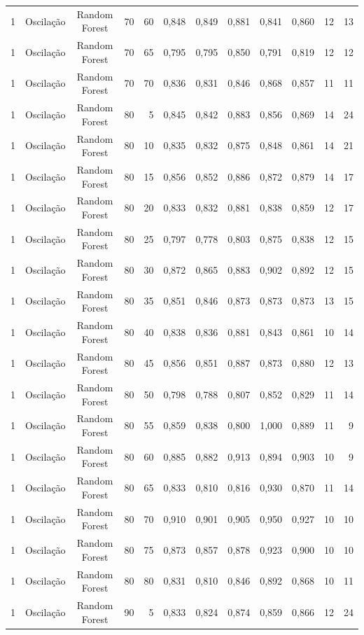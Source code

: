 \begin{longtable}{ccclrrrrrrrr}
1 & Oscilação & Random Forest & 70 & 60 & 0,848 & 0,849 & 0,881 & 0,841 & 0,860 & 12 & 13 \\
1 & Oscilação & Random Forest & 70 & 65 & 0,795 & 0,795 & 0,850 & 0,791 & 0,819 & 12 & 12 \\
1 & Oscilação & Random Forest & 70 & 70 & 0,836 & 0,831 & 0,846 & 0,868 & 0,857 & 11 & 11 \\
1 & Oscilação & Random Forest & 80 & 5 & 0,845 & 0,842 & 0,883 & 0,856 & 0,869 & 14 & 24 \\
1 & Oscilação & Random Forest & 80 & 10 & 0,835 & 0,832 & 0,875 & 0,848 & 0,861 & 14 & 21 \\
1 & Oscilação & Random Forest & 80 & 15 & 0,856 & 0,852 & 0,886 & 0,872 & 0,879 & 14 & 17 \\
1 & Oscilação & Random Forest & 80 & 20 & 0,833 & 0,832 & 0,881 & 0,838 & 0,859 & 12 & 17 \\
1 & Oscilação & Random Forest & 80 & 25 & 0,797 & 0,778 & 0,803 & 0,875 & 0,838 & 12 & 15 \\
1 & Oscilação & Random Forest & 80 & 30 & 0,872 & 0,865 & 0,883 & 0,902 & 0,892 & 12 & 15 \\
1 & Oscilação & Random Forest & 80 & 35 & 0,851 & 0,846 & 0,873 & 0,873 & 0,873 & 13 & 15 \\
1 & Oscilação & Random Forest & 80 & 40 & 0,838 & 0,836 & 0,881 & 0,843 & 0,861 & 10 & 14 \\
1 & Oscilação & Random Forest & 80 & 45 & 0,856 & 0,851 & 0,887 & 0,873 & 0,880 & 12 & 13 \\
1 & Oscilação & Random Forest & 80 & 50 & 0,798 & 0,788 & 0,807 & 0,852 & 0,829 & 11 & 14 \\
1 & Oscilação & Random Forest & 80 & 55 & 0,859 & 0,838 & 0,800 & 1,000 & 0,889 & 11 & 9 \\
1 & Oscilação & Random Forest & 80 & 60 & 0,885 & 0,882 & 0,913 & 0,894 & 0,903 & 10 & 9 \\
1 & Oscilação & Random Forest & 80 & 65 & 0,833 & 0,810 & 0,816 & 0,930 & 0,870 & 11 & 14 \\
1 & Oscilação & Random Forest & 80 & 70 & 0,910 & 0,901 & 0,905 & 0,950 & 0,927 & 10 & 10 \\
1 & Oscilação & Random Forest & 80 & 75 & 0,873 & 0,857 & 0,878 & 0,923 & 0,900 & 10 & 10 \\
1 & Oscilação & Random Forest & 80 & 80 & 0,831 & 0,810 & 0,846 & 0,892 & 0,868 & 10 & 11 \\
1 & Oscilação & Random Forest & 90 & 5 & 0,833 & 0,824 & 0,874 & 0,859 & 0,866 & 12 & 24 \\

\end{longtable}
